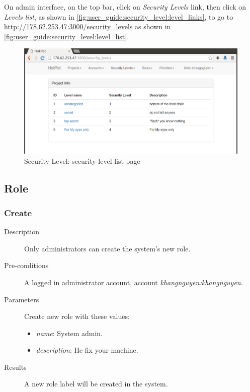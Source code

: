 On admin interface, on the top bar, click on \emph{Security Levels} link, then click on \emph{Levels list}, as shown in \autoref{fig:user_guide:security_level:level_links}, 
to go to \href{http://178.62.253.47:3000/security\_levels}{http://178.62.253.47:3000/security\_levels} as shown in \autoref{fig:user_guide:security_level:level_list}.

\begin{figure}[bth]
\myfloatalign
\includegraphics[width=1.0\linewidth]{gfx/chapter_5/security_level/level_list}
\caption[Security Level: security level list page]{Security Level: security level list page}
\label{fig:user_guide:security_level:level_list}
\end{figure}

\subsection{Role}
\label{ch:appendix-a:user_guide:role}
\subsubsection{Create}
\label{ch:appendix-a:user_guide:role:create}

\begin{description}
\item[Description] Only administrators can create the system's new role.
\item[Pre-conditions] A logged in administrator account, \eg account \emph{khangnguyen:khangnguyen}.
\item[Parameters] Create new role with these values:
\begin{itemize}
\item \emph{name}: System admin.
\item \emph{description}: He fix your machine.
\end{itemize}
\item[Results] A new role label will be created in the system.
\end{description}

